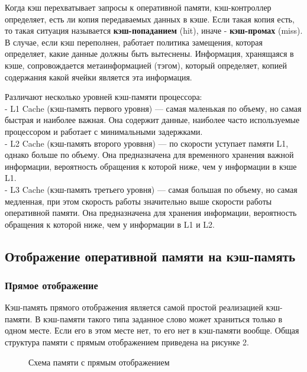 \documentclass[13pt]{article}
\begin{document}
	Когда кэш перехватывает запросы к оперативной памяти, кэш-контроллер определяет, есть ли копия передаваемых данных в кэше. Если такая копия есть, то такая ситуация называется \textbf{кэш-попаданием} (hit), иначе - \textbf{кэш-промах} (miss). В случае, если кэш переполнен, работает политика замещения, которая определяет, какие данные должны быть вытеснены. Информация, хранящаяся в кэше, сопровождается метаинформацией (тэгом), который определяет, копией содержания какой ячейки является эта информация.
	
	Различают несколько уровней кэш-памяти процессора:\\
	- L1 Cache (кэш-память первого уровня) --- самая маленькая по объему, но самая быстрая и наиболее важная. Она содержит данные, наиболее часто используемые процессором и работает с минимальными задержками.\\
	- L2 Cache (кэш-память второго уроввня) --- по скорости уступает памяти L1, однако больше по объему. Она предназначена для временного хранения важной информации, вероятность обращения к которой ниже, чем у информации в кэше L1.\\
	- L3 Cache (кэш-память третьего уровня) --- самая большая по объему, но самая медленная, при этом скорость работы значительно выше скорости работы оперативной памяти. Она предназначена для хранения информации, вероятность обращения к которой ниже, чем у информации в L1 и L2. \cite{book:33862}\\
	\subsection{Отображение оперативной памяти на кэш-память}
	\subsubsection{Прямое отображение}
	
	Кэш-память прямого отображения является самой простой реализацией кэш-памяти. В кэш-памяти такого типа заданное слово может храниться только в одном месте. Если его в этом месте нет, то его нет в кэш-памяти вообще. Общая структура памяти с прямым отображением приведена на рисунке 2.
	\begin{figure}[h!]
		\caption{Схема памяти с прямым отображением}
	\end{figure}
	
\end{document}
